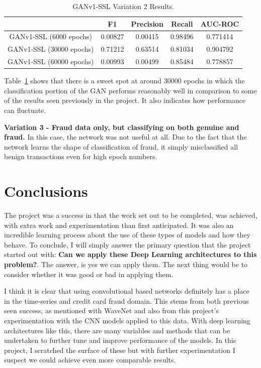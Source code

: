 \documentclass[12pt,a4paper,twoside]{report}
\begin{document}
\begin{table}[H]  
  \centering
  \begin{tabular}{ccccc}
    \toprule
           		& F1 & Precision & Recall & AUC-ROC \\ \midrule
    GANv1-SSL (6000 epochs) & 0.00827  &  0.00415 & 0.98496  & 0.771414 \\
    GANv1-SSL (30000 epochs) & 0.71212  &  0.63514 & 0.81034  & 0.904792 \\
    GANv1-SSL (60000 epochs) & 0.00993   &   0.00499 & 0.85484 & 0.778857  \\
   
   \bottomrule
 \end{tabular}
 \caption{GANv1-SSL Variation 2 Results.}
\label{table:ganv1-ssl-halfhalf}
\end{table}

Table~\ref{table:ganv1-ssl-halfhalf} shows that there is a sweet spot at around 30000 epochs in which the classification portion of the GAN performs reasonably well in comparison to some of the results seen previously in the project. It also indicates how performance can fluctuate. 

\textbf{Variation 3 - Fraud data only, but classifying on both genuine and fraud.}
In this case, the network was not useful at all. Due to the fact that the network learns the shape of classification of fraud, it simply misclassified all benign transactions even for high epoch numbers. 


\chapter{Conclusions}

The project was a success in that the work set out to be completed, was achieved, with extra work and experimentation than first anticipated. It was also an incredible learning process about the use of these types of models and how they behave.
To conclude, I will simply answer the primary question that the project started out with: \textbf{Can we apply these Deep Learning architectures to this problem?}. The answer, is yes we can apply them. The next thing would be to consider whether it was good or bad in applying them.

 I think it is clear that using convolutional based networks definitely has a place in the time-series and credit card fraud domain. This stems from both previous seen success, as mentioned with WaveNet and also from this project's experimentation with the CNN models applied to this data. With deep learning architectures like this, there are many variables and methods that can be undertaken to further tune and improve performance of the models. In this project, I scratched the surface of these but with further experimentation I suspect we could achieve even more comparable results. 
\end{document}
